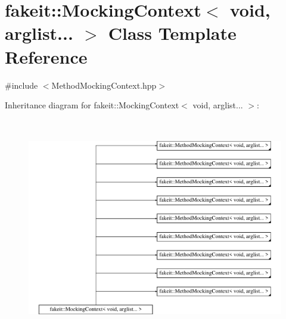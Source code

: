 \hypertarget{classfakeit_1_1MockingContext_3_01void_00_01arglist_8_8_8_01_4}{}\section{fakeit\+::Mocking\+Context$<$ void, arglist... $>$ Class Template Reference}
\label{classfakeit_1_1MockingContext_3_01void_00_01arglist_8_8_8_01_4}


{\ttfamily \#include $<$Method\+Mocking\+Context.\+hpp$>$}

Inheritance diagram for fakeit\+::Mocking\+Context$<$ void, arglist... $>$\+:\begin{figure}[H]
\begin{center}
\leavevmode
\includegraphics[height=9.621993cm]{classfakeit_1_1MockingContext_3_01void_00_01arglist_8_8_8_01_4}
\end{center}
\end{figure}
